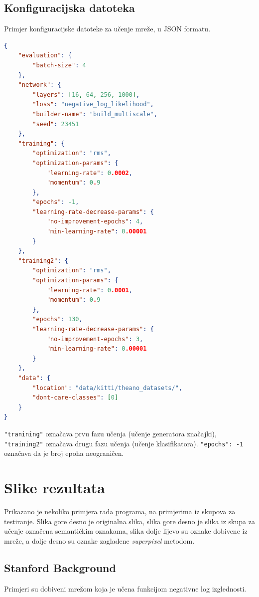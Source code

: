 \documentclass[times, utf8, diplomski, numeric]{fer}
\begin{document}
\section{Konfiguracijska datoteka}
\label{chap:konfiguracijska datoteka}

Primjer konfiguracijske datoteke za učenje mreže, u JSON formatu.
\begin{lstlisting}[language=json]
{
    "evaluation": {
        "batch-size": 4
    },
    "network": {
        "layers": [16, 64, 256, 1000],
        "loss": "negative_log_likelihood",
        "builder-name": "build_multiscale",
        "seed": 23451
    },
    "training": {
        "optimization": "rms",
        "optimization-params": {
            "learning-rate": 0.0002,
            "momentum": 0.9
        },
        "epochs": -1,
        "learning-rate-decrease-params": {
            "no-improvement-epochs": 4,
            "min-learning-rate": 0.00001
        }
    },
    "training2": {
        "optimization": "rms",
        "optimization-params": {
            "learning-rate": 0.0001,
            "momentum": 0.9
        },
        "epochs": 130,
        "learning-rate-decrease-params": {
            "no-improvement-epochs": 3,
            "min-learning-rate": 0.00001
        }
    },
    "data": {
        "location": "data/kitti/theano_datasets/",
        "dont-care-classes": [0]
    }
}
\end{lstlisting}
\texttt{"tranining"} označava prvu fazu učenja (učenje generatora značajki), \texttt{"training2"} označava drugu fazu učenja (učenje klasifikatora). \texttt{"epochs": -1} označava da je broj epoha neograničen.

\chapter{Slike rezultata}
Prikazano je nekoliko primjera rada programa, na primjerima iz skupova za testiranje. Slika gore desno je originalna slika, slika gore desno je slika iz skupa za učenje označena semantičkim oznakama, slika dolje lijevo su oznake dobivene iz mreže, a dolje desno su oznake zaglađene \textit{superpixel} metodom.

\section{Stanford Background}
Primjeri su dobiveni mrežom koja je učena funkcijom negativne log izglednosti.
\end{document}
